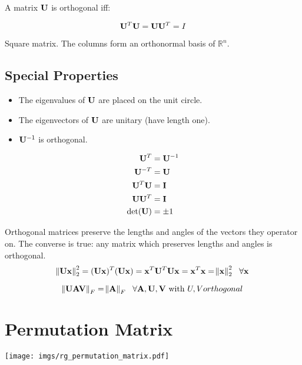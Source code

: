 A matrix $\mathbf{U}$ is orthogonal iff:

\begin{equation}
\mathbf{U}^T \mathbf{U} = \mathbf{U} \mathbf{U}^T = I
\end{equation}

Square matrix. The columns form an orthonormal basis of $\mathbb{R}^n$.



\subsection*{Special Properties}

\begin{itemize}
\item The eigenvalues of $\mathbf{U}$ are placed on the unit circle.
\item The eigenvectors of $\mathbf{U}$ are unitary (have length one).
\item $\mathbf{U}^{-1}$ is orthogonal.
\end{itemize}

\begin{align}
\mathbf{U}^T     &= \mathbf{U}^{-1} \\
\mathbf{U}^{-T}  &= \mathbf{U}      \\
\mathbf{U}^T\mathbf{U}  &= \mathbf{I}      \\
\mathbf{U}\mathbf{U}^T  &= \mathbf{I}      \\
\det(\mathbf{U}) &= \pm1
\end{align}



Orthogonal matrices preserve the lengths and angles of the vectors they operator on. The converse is true: any matrix which preserves lengths and angles is orthogonal.
\begin{equation}
\norm{\mathbf{U} \mathbf{x}}^2_2=(\mathbf{U}\mathbf{x})^T(\mathbf{U}\mathbf{x})=\mathbf{x}^T\mathbf{U}^T\mathbf{U}\mathbf{x}=\mathbf{x}^T\mathbf{x}=\norm{\mathbf{x}}^2_2~~\forall \mathbf{x}
\end{equation}

\begin{equation}
\norm{\mathbf{U} \mathbf{A} \mathbf{V}}_F=\norm{\mathbf{A}}_F~~\forall \mathbf{A},\mathbf{U},\mathbf{V}~\textrm{with}~U,V orthogonal
\end{equation}



\section{Permutation Matrix}
\begin{center}
\texttt{[image: imgs/rg\_permutation\_matrix.pdf]}
\end{center}

